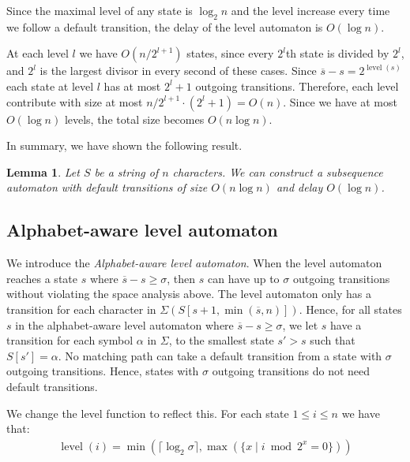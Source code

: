 \documentclass[a4paper,11pt]{article}
\newtheorem{lemma}{Lemma}
\DeclareMathOperator{\level}{level}
\begin{document}
Since the maximal level of any state is $\log_2 n$ and the level increase every time we follow a default transition, the delay of the level automaton is $O(\log n)$.







At each level $l$ we have $O(n/2^{l+1})$ states, since every $2^l$th state is divided by $2^l$, and $2^l$ is the largest divisor in every second of these cases. Since $\overline{s} - s = 2^{\level(s)}$ each state at level $l$ has at most $2^{l}+1$ outgoing transitions. Therefore, each level contribute with size at most $n/2^{l+1} \cdot (2^{l}+1)= O(n)$. Since we have at most $O(\log n)$ levels, the total size becomes $O(n\log n)$.

In summary, we have shown the following result.
\begin{lemma}\label{lemma:levelaut}
Let $S$ be a string of $n$ characters. We can construct a subsequence automaton with default transitions of size $O(n\log n)$ and delay $O(\log n)$.
\end{lemma}




\subsection{Alphabet-aware level automaton}
We introduce the \emph{Alphabet-aware level automaton}. When the level automaton reaches a state $s$ where $\overline{s}-s\geq\sigma$, then $s$ can have up to $\sigma$ outgoing transitions without violating the space analysis above. The level automaton only has a transition for each character in $\Sigma(S[s+1, \min(\overline{s}, n)])$. Hence, for all states $s$ in the alphabet-aware level automaton where $\overline{s} -s \geq \sigma$, we let $s$ have a transition for each symbol $\alpha$ in $\Sigma$, to the smallest state $s'>s$ such that $S[s']=\alpha$. No matching path can take a default transition from a state with $\sigma$ outgoing transitions. Hence, states with $\sigma$ outgoing transitions do not need default transitions.

We change the level function to reflect this. For each state $1\leq i \leq n$ we have that:
\begin{gather*}
\level(i)= \min(\lceil \log_2 \sigma \rceil, \max(\{x \;|\; i \bmod 2^x = 0 \}))
\end{gather*}
\end{document}
